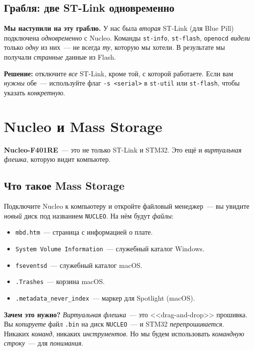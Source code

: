 \subsection{Грабля: две ST-Link одновременно}

\begin{warnbox}
\textbf{Мы наступили на эту граблю.} У нас была
\emph{вторая} ST-Link (для Blue Pill) подключена
\emph{одновременно} с Nucleo. Команды \texttt{st-info},
\texttt{st-flash}, \texttt{openocd} \emph{видели} только
\emph{одну} из них~--- не всегда \emph{ту}, которую
мы хотели. В результате мы получали \emph{странные}
данные из Flash.

\textbf{Решение:} отключите \emph{все} ST-Link, кроме
той, с которой работаете. Если вам \emph{нужны} обе~---
используйте флаг \texttt{-s <serial>} в \texttt{st-util}
или \texttt{st-flash}, чтобы указать \emph{конкретную}.
\end{warnbox}

\section{Nucleo и Mass Storage}
\label{sec:flashing-massstorage}

\textbf{Nucleo-F401RE}~--- это не только ST-Link и STM32.
Это ещё и \emph{виртуальная флешка}, которую видит
компьютер.

\subsection{Что такое Mass Storage}

Подключите Nucleo к компьютеру и откройте файловый
менеджер~--- вы увидите \emph{новый} диск под названием
\texttt{NUCLEO}. На нём будут \emph{файлы}:

\begin{itemize}
    \item \texttt{mbd.htm}~--- страница с информацией
          о плате.
    \item \texttt{System Volume Information}~--- служебный
          каталог Windows.
    \item \texttt{fseventsd}~--- служебный каталог macOS.
    \item \texttt{.Trashes}~--- корзина macOS.
    \item \texttt{.metadata\_never\_index}~--- маркер для
          Spotlight (macOS).
\end{itemize}

\begin{ideabox}
\textbf{Зачем это нужно?} \emph{Виртуальная флешка}~---
это <<drag-and-drop>> прошивка. Вы \emph{копируете}
файл \texttt{.bin} на диск \texttt{NUCLEO}~--- и
STM32 \emph{перепрошивается}. Никаких \emph{команд},
никаких \emph{инструментов}. Но мы будем использовать
\emph{командную строку}~--- для \emph{понимания}.
\end{ideabox}

